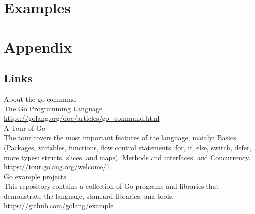 \documentclass[12pt,letterpaper,dvips]{article}
\begin{document}
  
\section{Examples}


\newpage
\setcounter{secnumdepth}{0}
\section{Appendix}


\subsection{Links}

About the go command\\
The Go Programming Language\\
\href{https://golang.org/doc/articles/go\_command.html}{https://golang.org/doc/articles/go\_command.html}
\\

\noindent A Tour of Go\\
The tour covers the most important features of the language,
mainly: Basics (Packages, variables, functions, flow control
statements: for, if, else, switch, defer, more types:
structs, slices, and maps), Methods and interfaces, and
Concurrency.\\
\href{https://tour.golang.org/welcome/}{https://tour.golang.org/welcome/1}
\\

\noindent Go example projects\\
This repository contains a collection of Go programs
and libraries that demonstrate the language,
standard libraries, and tools.\\
\href{https://github.com/golang/example}{https://github.com/golang/example}
\\
\end{document}
